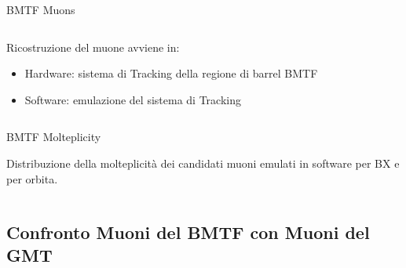 \documentclass{beamer}
\begin{document}
\begin{frame}{BMTF Muons}

\begin{columns}

    \begin{column}{0.5\textwidth}
    Ricostruzione del muone avviene in:
    \begin{itemize}
        \item Hardware: sistema di Tracking della regione di barrel BMTF
        \item Software: emulazione del sistema di Tracking
    \end{itemize}
    

    \end{column}
    \begin{column}{0.5\textwidth}
        \centering
    \end{column}
\end{columns}

\end{frame}


\begin{frame}{BMTF Molteplicity}

Distribuzione della molteplicità dei candidati muoni emulati in software per BX e per orbita.

\vspace{0.8 cm}

\begin{columns}

    \begin{column}{0.5\textwidth}
    \end{column}
    \begin{column}{0.5\textwidth}
        \centering
    \end{column}
\end{columns}

\end{frame}

\subsection{Confronto Muoni del BMTF con Muoni del GMT}
\end{document}
